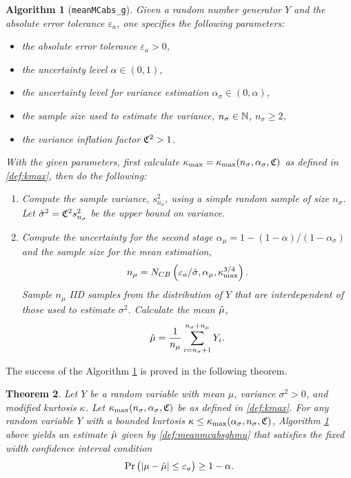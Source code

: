 \documentclass{iitthesis}
\newtheorem{theorem}{Theorem}[section]
\newtheorem{algorithm}[theorem]{Algorithm}
\begin{document}
\begin{algorithm}[{\tt meanMCabs\_g}]\label{alg:meanMCabsg}
Given a random number generator $Y$ and the absolute error tolerance $\varepsilon_a$, one specifies the following parameters:
\begin{itemize}
\item the absolute error tolerance $\varepsilon_a >0$,
\item the uncertainty level $\alpha \in (0,1)$,
\item the uncertainty level for variance estimation $\alpha_\sigma \in (0,\alpha)$,
\item the sample size used to estimate the variance, $n_{\sigma} \in \mathbb{N}$, $n_{\sigma} \geq 2$,
\item the variance inflation factor $\mathfrak{C}^2 >1$.
\end{itemize}
With the given parameters, first calculate $\kappa_{\max}=\kappa_{\max}(n_\sigma,\alpha_\sigma,\mathfrak{C})$ as defined in \eqref{def:kmax}, then do the following:
\begin{enumerate}
\item Compute the sample variance, $s^2_{n_{\sigma}}$, using a simple random sample of size $n_\sigma$. Let $\hat{\sigma}^2 = \mathfrak{C}^2 s^2_{n_\sigma}$ be the upper bound on variance.
\item Compute the uncertainty for the second stage $\alpha_\mu = 1-(1-\alpha)/(1-\alpha_{\sigma})$ and the sample size for the mean estimation,
\begin{align}\label{def:meanmcabsgnmu}
n_\mu = N_{CB} \left(\varepsilon_a/\hat{\sigma},\alpha_\mu, \kappa_{\max}^{3/4}\right).
\end{align}
Sample $n_\mu$ IID samples from the distribution of $Y$ that are interdependent of those used to estimate $\sigma^2$. Calculate the mean $\tilde{\mu}$,
\begin{align}\label{def:meanmcabsghmu}
\hat{\mu} = \frac{1}{n_\mu}\sum_{i = n_\sigma+1}^{n_\sigma+n_\mu}Y_i.
\end{align}
\end{enumerate}
\end{algorithm}
The success of the Algorithm \ref{alg:meanMCabsg} is proved in the following theorem.
\begin{theorem}\label{thm:meanMCabsg}
Let $Y$ be a random variable with mean $\mu$, variance $\sigma^2 >0$, and modified kurtosis $\kappa$. Let $\kappa_{\max}(n_\sigma,\alpha_\sigma,\mathfrak{C})$ be as defined in \eqref{def:kmax}. For any random variable $Y$ with a bounded kurtosis $\kappa\leq\kappa_{\max}(\alpha_{\sigma},n_{\sigma},\mathfrak{C})$, Algorithm \ref{alg:meanMCabsg} above yields an estimate $\hat{\mu}$ given by \eqref{def:meanmcabsghmu} that satisfies the fixed width confidence interval condition
\begin{align}
\Pr\left( \left \lvert \mu-\hat{\mu} \right \rvert \leq \varepsilon_a \right) \geq 1-\alpha.
\end{align}
\end{theorem}
\end{document}
